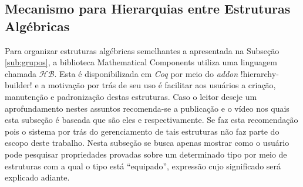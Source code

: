 \subsection{Mecanismo para Hierarquias entre Estruturas Algébricas}

Para organizar estruturas algébricas semelhantes a apresentada na Subseção \ref{sub:grupos}, a biblioteca Mathematical Components utiliza uma linguagem chamada $\mathcal{HB}$. Esta é disponibilizada em \textit{Coq} por meio do \textit{addon} \coqinline!hierarchy-builder! e a motivação por trás de seu uso é facilitar aos usuários a criação, manutenção e padronização destas estruturas. Caso o leitor deseje um aprofundamento nestes assuntos recomenda-se a publicação e o vídeo nos quais esta subseção é baseada que são eles \cite{cohen:hal-02478907} e \cite{youtuCohen} respectivamente. Se faz esta recomendação pois o sistema por trás do gerenciamento de tais estruturas não faz parte do escopo deste trabalho. Nesta subseção se busca apenas mostrar como o usuário pode pesquisar propriedades provadas sobre um determinado tipo por meio de estruturas com a qual o tipo está ``equipado'', expressão cujo significado será explicado adiante.


